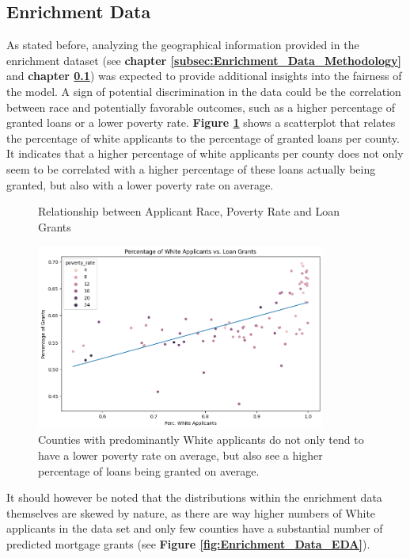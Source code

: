 \subsection{Enrichment Data}\label{subsec:Enrichment_Data}

As stated before, analyzing the geographical information provided in the enrichment dataset (see \textbf{chapter \ref{subsec:Enrichment_Data_Methodology}} and \textbf{chapter \ref{subsec:Enrichment_Data}}) was expected to provide additional insights into the fairness of the model.
A sign of potential discrimination in the data could be the correlation between race and potentially favorable outcomes, such as a higher percentage of granted loans or a lower poverty rate.
\textbf{Figure \ref{fig:Scatter_White_Applicants_Loan_Grant}} shows a scatterplot that relates the percentage of white applicants to the percentage of granted loans per county. It indicates that a higher percentage of white applicants per county does not only seem to be correlated with a higher percentage of these loans actually being granted, but also with a lower poverty rate on average.

\begin{figure}[h]
    \centering
    \caption{Relationship between Applicant Race, Poverty Rate and Loan Grants}
    \includegraphics[width=0.85\textwidth]{images/CHXX_Perc_Grants_vs_Perc_White.png}
    \caption*{Counties with predominantly White applicants do not only tend to have a lower poverty rate on average, but also see a higher percentage of loans being granted on average.}
    \label{fig:Scatter_White_Applicants_Loan_Grant}
\end{figure}

It should however be noted that the distributions within the enrichment data themselves are skewed by nature, as there are way higher numbers of White applicants in the data set and only few counties have a substantial number of predicted mortgage grants (see \textbf{Figure \ref{fig:Enrichment_Data_EDA}}).

